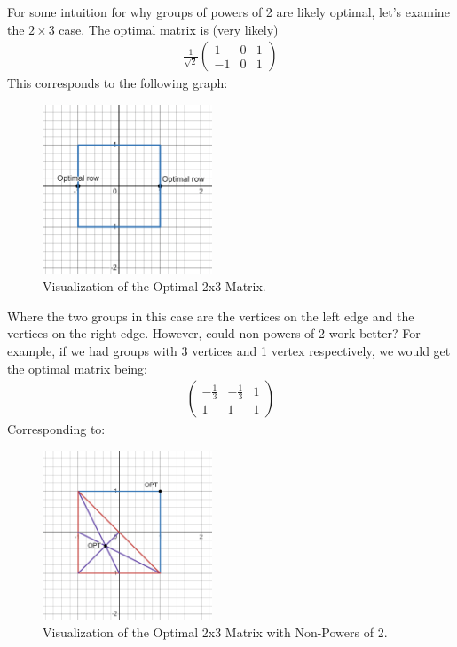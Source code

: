 \documentclass[12pt]{article}
\theoremstyle{definitionstyle}
\begin{document}
    For some intuition for why groups of powers of 2 are likely optimal, let's examine the $2 \times 3$ case. The optimal matrix is (very likely) 
    \begin{align*}
        \frac{1}{\sqrt{2}}\begin{pmatrix}
            1 & 0 & 1 \\
            -1 & 0 & 1
        \end{pmatrix}
    \end{align*}
    This corresponds to the following graph:
    \begin{figure}[H]
        \centering
        \includegraphics[width=0.45\textwidth]{opt2x3.png}
        \caption{Visualization of the Optimal 2x3 Matrix.}
        \label{fig: opt2x3}
    \end{figure}
    Where the two groups in this case are the vertices on the left edge and the vertices on the right edge. However, could non-powers of 2 work better? For example, if we had groups with 3 vertices and 1 vertex respectively, we would get the optimal matrix being:
    \begin{align*}
        \begin{pmatrix}
            -\frac13 & -\frac13 & 1 \\
            1 & 1 & 1
        \end{pmatrix}
    \end{align*}
    Corresponding to:
    \begin{figure}[H]
        \centering
        \includegraphics[width=0.45\textwidth]{opt3points.png}
        \caption{Visualization of the Optimal 2x3 Matrix with Non-Powers of 2.}
        \label{fig: opt2x3nonpow}
    \end{figure}
\end{document}
